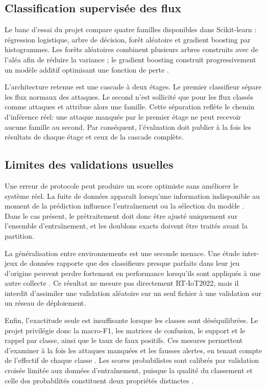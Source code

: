 \subsection{Classification supervis\'ee des flux}

Le banc d'essai du projet compare quatre familles disponibles dans
Scikit-learn \citep{pedregosa_scikit-learn_2011}: r\'egression logistique, arbre
de d\'ecision, for\^et al\'eatoire et gradient boosting par histogrammes. Les for\^ets
al\'eatoires combinent plusieurs arbres construits avec de l'al\'ea afin de r\'eduire
la variance \citep{breiman_random_2001}; le gradient boosting construit
progressivement un mod\`ele additif optimisant une fonction de perte
\citep{friedman_greedy_2001}.

L'architecture retenue est une cascade \`a deux \'etages. Le premier classifieur
s\'epare les flux normaux des attaques. Le second n'est sollicit\'e que pour les
flux class\'es comme attaques et attribue alors une famille. Cette s\'eparation
refl\`ete le chemin d'inf\'erence r\'eel: une attaque manqu\'ee par le premier
\'etage ne peut recevoir aucune famille au second. Par cons\'equent, l'\'evaluation
doit publier \`a la fois les r\'esultats de chaque \'etage et ceux de la cascade
compl\`ete.

\subsection{Limites des validations usuelles}

Une erreur de protocole peut produire un score optimiste sans am\'eliorer le
syst\`eme r\'eel. La fuite de donn\'ees appara\^it lorsqu'une information indisponible
au moment de la pr\'ediction influence l'entra\^inement ou la s\'election du mod\`ele
\citep{kaufman_leakage_2012}. Dans le cas pr\'esent, le pr\'etraitement doit donc
\^etre ajust\'e uniquement sur l'ensemble d'entra\^inement, et les doublons exacts
doivent \^etre trait\'es avant la partition.

La g\'en\'eralisation entre environnements est une seconde menace. Une \'etude
inter-jeux de donn\'ees rapporte que des classifieurs presque parfaits dans leur
jeu d'origine peuvent perdre fortement en performance lorsqu'ils sont appliqu\'es
\`a une autre collecte \citep{cantone_machine_2024}. Ce r\'esultat ne mesure pas
directement RT-IoT2022, mais il interdit d'assimiler une validation al\'eatoire sur
un seul fichier \`a une validation sur un r\'eseau de d\'eploiement.

Enfin, l'exactitude seule est insuffisante lorsque les classes sont
d\'es\'equilibr\'ees. Le projet privil\'egie donc la macro-F1, les matrices de
confusion, le support et le rappel par classe, ainsi que le taux de faux positifs.
Ces mesures permettent d'examiner à la fois les attaques manquées et les
fausses alertes, en tenant compte de l'effectif de chaque classe
\citep{sokolova_systematic_2009}. Les scores probabilistes sont calibr\'es par
validation crois\'ee limit\'ee aux donn\'ees d'entra\^inement, puisque la qualit\'e du classement et celle des
probabilit\'es constituent deux propri\'et\'es distinctes
\citep{niculescu-mizil_predicting_2005}.

